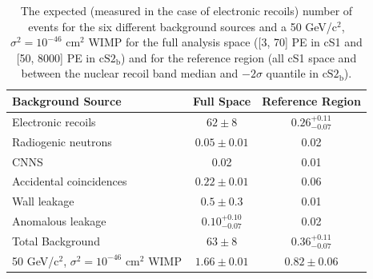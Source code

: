 \begin{table}[b]
\centering
\def\arraystretch{1.3}
\begin{tabular}{lcc}
\hline
Background Source & Full Space & Reference Region  \\
\hline
Electronic recoils & $62 \pm 8$ & $0.26^{+0.11}_{-0.07}$ \\ 
Radiogenic neutrons & $0.05 \pm 0.01$ & 0.02 \\ 
CNNS & 0.02 & 0.01 \\ 
Accidental coincidences & $0.22 \pm 0.01$ & 0.06 \\ 
Wall leakage & $0.5 \pm 0.3$ & 0.01 \\ 
Anomalous leakage & $0.10^{+0.10}_{-0.07}$ & 0.02 \\ \hline
Total Background & $63 \pm 8$ & $0.36^{+0.11}_{-0.07}$ \\
50 GeV/$\textrm{c}^2$, $\sigma^2 = 10^{-46} \, \, \textrm{cm}^2$ WIMP & $1.66 \pm 0.01$ & $0.82 \pm 0.06$ \\ \hline 
\end{tabular}
\caption{The expected (measured in the case of electronic recoils) number of events for the six different background sources and a 50 GeV/$\textrm{c}^2$, $\sigma^2 = 10^{-46} \, \, \textrm{cm}^2$ WIMP for the full analysis space ([3, 70] PE in cS1 and [50, 8000] PE in $\textrm{cS2}_{\textrm{b}}$) and for the reference region (all cS1 space and between the nuclear recoil band median and $-2\sigma$ quantile in $\textrm{cS2}_{\textrm{b}}$).}
\label{tab:xe1t_bkg_events_fsr}
\end{table}


